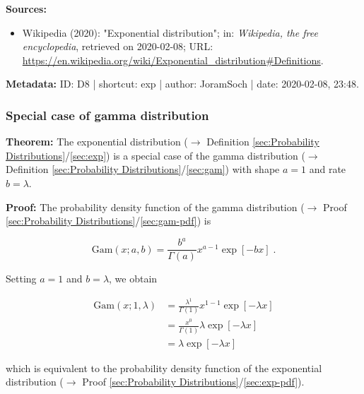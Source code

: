 \documentclass[a4paper,12pt,twoside]{book}
\begin{document}
\vspace{1em}
\textbf{Sources:}
\begin{itemize}
\item Wikipedia (2020): "Exponential distribution"; in: \textit{Wikipedia, the free encyclopedia}, retrieved on 2020-02-08; URL: \url{https://en.wikipedia.org/wiki/Exponential_distribution#Definitions}.
\end{itemize}


\vspace{1em}
\textbf{Metadata:} ID: D8 | shortcut: exp | author: JoramSoch | date: 2020-02-08, 23:48.
\vspace{1em}



\subsubsection[\textbf{Special case of gamma distribution}]{Special case of gamma distribution} \label{sec:exp-gam}
\setcounter{equation}{0}

\textbf{Theorem:} The exponential distribution ($\rightarrow$ Definition \ref{sec:Probability Distributions}/\ref{sec:exp}) is a special case of the gamma distribution ($\rightarrow$ Definition \ref{sec:Probability Distributions}/\ref{sec:gam}) with shape $a = 1$ and rate $b = \lambda$.


\vspace{1em}
\textbf{Proof:} The probability density function of the gamma distribution ($\rightarrow$ Proof \ref{sec:Probability Distributions}/\ref{sec:gam-pdf}) is

\begin{equation} \label{eq:exp-gam-gam-pdf}
\mathrm{Gam}(x; a, b) = \frac{b^a}{\Gamma(a)} x^{a-1} \exp[-b x] \; .
\end{equation}

Setting $a = 1$ and $b = \lambda$, we obtain

\begin{equation} \label{eq:exp-gam-exp-pdf}
\begin{split}
\mathrm{Gam}(x; 1, \lambda) &= \frac{\lambda^1}{\Gamma(1)} x^{1-1} \exp[-\lambda x] \\
&= \frac{x^0}{\Gamma(1)} \lambda \exp[-\lambda x] \\
&= \lambda \exp[-\lambda x]
\end{split}
\end{equation}

which is equivalent to the probability density function of the exponential distribution ($\rightarrow$ Proof \ref{sec:Probability Distributions}/\ref{sec:exp-pdf}).
\end{document}
